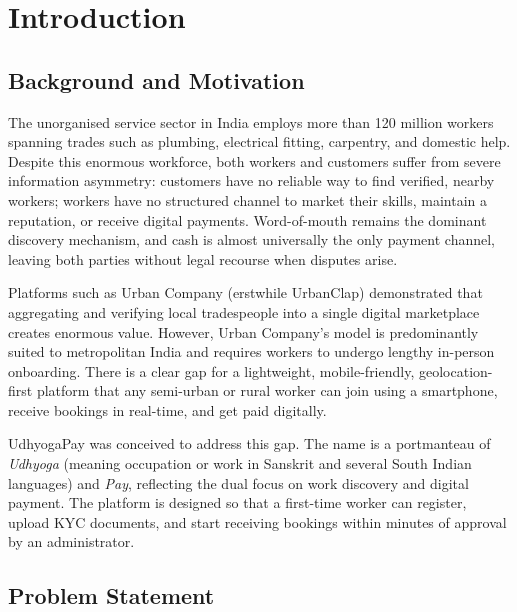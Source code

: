 \documentclass[12pt,a4paper]{report}
\begin{document}
\chapter{Introduction}

\section{Background and Motivation}

The unorganised service sector in India employs more than 120 million workers spanning trades such as plumbing, electrical fitting, carpentry, and domestic help. Despite this enormous workforce, both workers and customers suffer from severe information asymmetry: customers have no reliable way to find verified, nearby workers; workers have no structured channel to market their skills, maintain a reputation, or receive digital payments. Word-of-mouth remains the dominant discovery mechanism, and cash is almost universally the only payment channel, leaving both parties without legal recourse when disputes arise.

Platforms such as Urban Company (erstwhile UrbanClap) demonstrated that aggregating and verifying local tradespeople into a single digital marketplace creates enormous value. However, Urban Company's model is predominantly suited to metropolitan India and requires workers to undergo lengthy in-person onboarding. There is a clear gap for a lightweight, mobile-friendly, geolocation-first platform that any semi-urban or rural worker can join using a smartphone, receive bookings in real-time, and get paid digitally.

UdhyogaPay was conceived to address this gap. The name is a portmanteau of \textit{Udhyoga} (meaning occupation or work in Sanskrit and several South Indian languages) and \textit{Pay}, reflecting the dual focus on work discovery and digital payment. The platform is designed so that a first-time worker can register, upload KYC documents, and start receiving bookings within minutes of approval by an administrator.

\section{Problem Statement}
\end{document}
